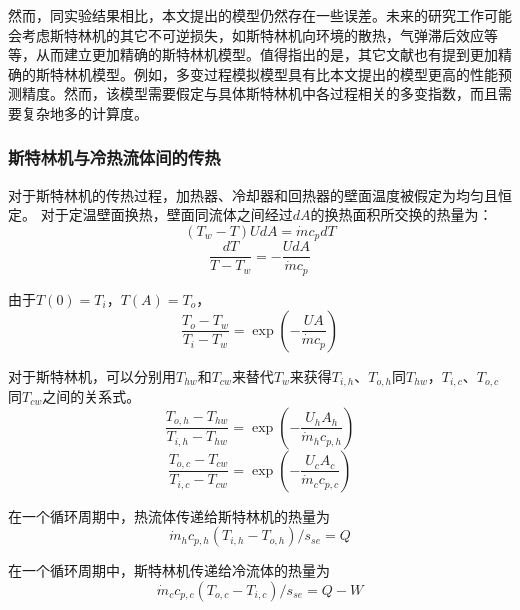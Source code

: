 然而，同实验结果相比，本文提出的模型仍然存在一些误差。未来的研究工作可能会考虑斯特林机的其它不可逆损失，如斯特林机向环境的散热，气弹滞后效应等等，从而建立更加精确的斯特林机模型。值得指出的是，其它文献也有提到更加精确的斯特林机模型。例如，多变过程模拟模型具有比本文提出的模型更高的性能预测精度\cite{Hosseinzade2015, Babaelahi2015}。然而，该模型需要假定与具体斯特林机中各过程相关的多变指数，而且需要复杂地多的计算度。

\subsubsection{斯特林机与冷热流体间的传热}

对于斯特林机的传热过程，加热器、冷却器和回热器的壁面温度被假定为均匀且恒定。
对于定温壁面换热，壁面同流体之间经过$dA$的换热面积所交换的热量为：
\begin{equation}
	(T_w-T)UdA = \dot{m}c_pdT
\end{equation}
\begin{equation}
	\frac{dT}{T-T_w}=-\frac{UdA}{\dot{m}c_p}
\end{equation}

由于$T(0)=T_i$，$T(A)=T_o$，
\begin{equation}
	\frac{T_o-T_w}{T_i-T_w}=\exp(-\frac{UA}{\dot{m}c_p})
\end{equation}

对于斯特林机，可以分别用$T_{hw}$和$T_{cw}$来替代$T_w$来获得$T_{i,h}$、$T_{o,h}$同$T_{hw}$，$T_{i,c}$、$T_{o,c}$同$T_{cw}$之间的关系式。
\begin{equation}
	\frac{T_{o,h}-T_{hw}}{T_{i,h}-T_{hw}}=\exp(-\frac{U_hA_h}{\dot{m}_hc_{p,h}})
	\label{Eq:T_h}
\end{equation}
\begin{equation}
	\frac{T_{o,c}-T_{cw}}{T_{i,c}-T_{cw}}=\exp(-\frac{U_cA_c}{\dot{m}_cc_{p,c}})
	\label{Eq:T_c}
\end{equation}

在一个循环周期中，热流体传递给斯特林机的热量为
\begin{equation}
	\dot{m}_hc_{p,h}(T_{i,h}-T_{o,h})/s_{se} = Q
	\label{Eq:q_h}
\end{equation}

在一个循环周期中，斯特林机传递给冷流体的热量为
\begin{equation}
	\dot{m}_cc_{p,c}(T_{o,c}-T_{i,c})/s_{se} = Q - W
	\label{Eq:q_c}
\end{equation}

